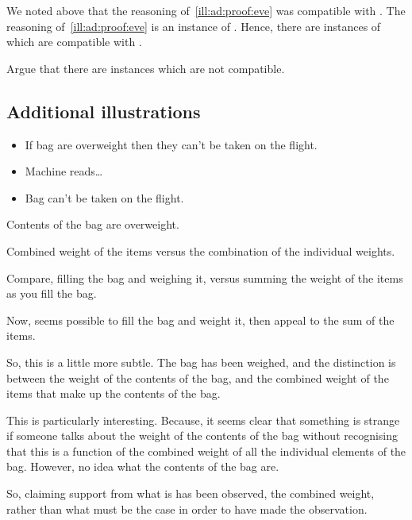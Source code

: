 \begin{note}[\ESU{}]
  We noted above that the reasoning of~\ref{ill:ad:proof:eve} was compatible with \ESU{}.
  The reasoning of~\ref{ill:ad:proof:eve} is an instance of \adB{}.
  Hence, there are instances of \adB{} which are compatible with \ESU{}.

  Argue that there are instances which are not compatible.
\end{note}

\subsection{Additional illustrations}

\begin{note}

  \begin{illustration}
    \mbox{}
    \vspace{-\baselineskip}
    \begin{itemize}
    \item If bag are overweight then they can't be taken on the flight.
    \item Machine reads\dots
    \item Bag can't be taken on the flight.
    \end{itemize}
  \end{illustration}
  Contents of the bag are overweight.

  Combined weight of the items versus the combination of the individual weights.

  Compare, filling the bag and weighing it, versus summing the weight of the items as you fill the bag.

  Now, seems possible to fill the bag and weight it, then appeal to the sum of the items.

  So, this is a little more subtle.
  The bag has been weighed, and the distinction is between the weight of the contents of the bag, and the combined weight of the items that make up the contents of the bag.

  This is particularly interesting.
  Because, it seems clear that something is strange if someone talks about the weight of the contents of the bag without recognising that this is a function of the combined weight of all the individual elements of the bag.
  However, no idea what the contents of the bag are.

  So, claiming support from what is has been observed, the combined weight, rather than what must be the case in order to have made the observation.
\end{note}

